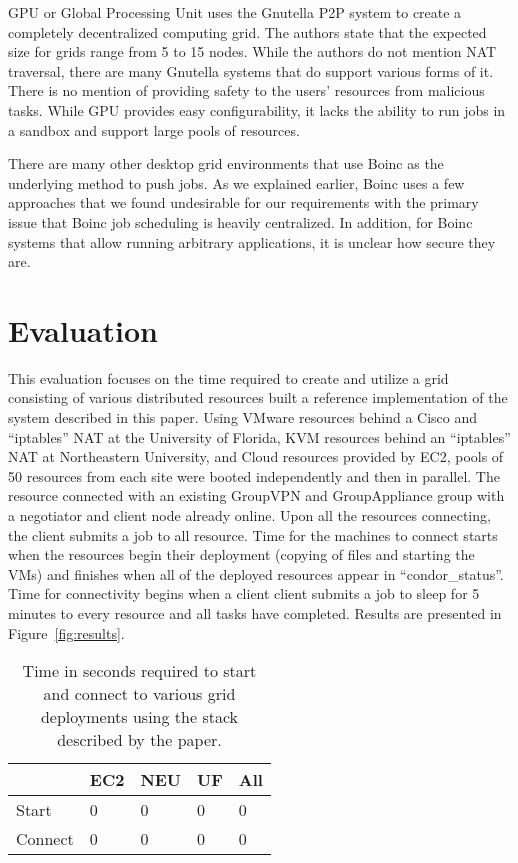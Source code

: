 \documentclass{sig-alternate}
\begin{document}
GPU or Global Processing Unit uses the Gnutella P2P system to create a
completely decentralized computing grid.  The authors state that the expected
size for grids range from 5 to 15 nodes.  While the authors do not mention NAT
traversal, there are many Gnutella systems that do support various forms of it.
There is no mention of providing safety to the users' resources from malicious
tasks.  While GPU provides easy configurability, it lacks the ability to run
jobs in a sandbox and support large pools of resources.

There are many other desktop grid environments that use Boinc as the underlying
method to push jobs.  As we explained earlier, Boinc uses a few approaches that
we found undesirable for our requirements with the primary issue that Boinc job
scheduling is heavily centralized.  In addition, for Boinc systems that allow
running arbitrary applications, it is unclear how secure they are.

\section{Evaluation}
\label{evaluation}
This evaluation focuses on the time required to create and utilize a grid
consisting of various distributed resources built a reference implementation of
the system described in this paper.  Using VMware resources behind a Cisco
and ``iptables'' NAT at the University of Florida, KVM resources behind an
``iptables'' NAT at Northeastern University, and Cloud resources provided by
EC2, pools of 50 resources from each site were booted independently and then in
parallel.  The resource connected with an existing GroupVPN and GroupAppliance
group with a negotiator and client node already online.  Upon all the resources
connecting, the client submits a job to all resource.  Time for the machines to
connect starts when the resources begin their deployment (copying of files and
starting the VMs) and finishes when all of the deployed resources appear in
``condor\_status''.  Time for connectivity begins when a client client submits
a job to sleep for 5 minutes to every resource and all tasks have completed.
Results are presented in Figure~\ref{fig:results}.

\begin{table}[h]
\setlength{\itemsep}{0pt}
\setlength{\parskip}{0pt}
\centering
\begin{tabular}[c]{|m{1.5cm}||m{1.2cm}|m{1.2cm}|m{1.2cm}|m{1.2cm}|} \hline
& EC2 & NEU & UF & All \\ \hline\hline
Start & 0 & 0 & 0 & 0\\ \hline
Connect & 0 & 0 & 0 & 0\\ \hline
\end{tabular}
\caption{Time in seconds required to start and connect to various grid
deployments using the stack described by the paper.}
\label{fig:cbc_issue}
\end{table}
\end{document}
